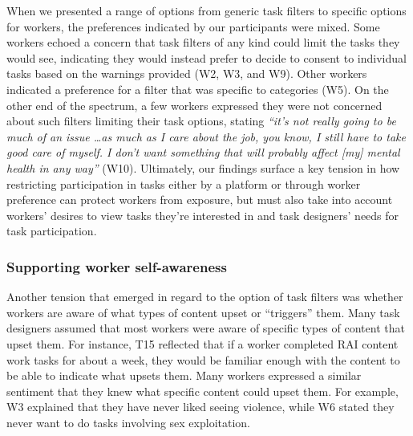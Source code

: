 When we presented a range of options from generic task filters to specific options for workers, the preferences indicated by our participants were mixed. Some workers echoed a concern that task filters of any kind could limit the tasks they would see, indicating they would instead prefer to decide to consent to individual tasks based on the warnings provided (W2, W3, and W9). Other workers indicated a preference for a filter that was specific to categories (W5). On the other end of the spectrum, a few workers expressed they were not concerned about such filters limiting their task options, stating \textit{``it's not really going to be much of an issue \dots as much as I care about the job, you know, I still have to take good care of myself. I don't want something that will probably affect [my] mental health in any way''} (W10). Ultimately, our findings surface a key tension in how restricting participation in tasks either by a platform or through worker preference can protect workers from exposure, but must also take into account workers' desires to view tasks they're interested in and task designers' needs for task participation. 

\subsubsection{Supporting worker self-awareness}
Another tension that emerged in regard to the option of task filters was whether workers are aware of what types of content upset or ``triggers'' them. Many task designers assumed that most workers were aware of specific types of content that upset them. For instance, T15 reflected that if a worker completed RAI content work tasks for about a week, they would be familiar enough with the content to be able to indicate what upsets them. Many workers expressed a similar sentiment that they knew what specific content could upset them. For example, W3 explained that they have never liked seeing violence, while W6 stated they never want to do tasks involving sex exploitation. 

